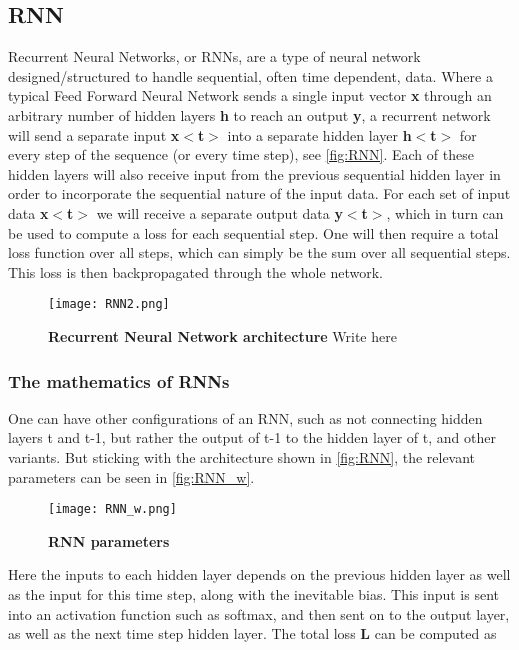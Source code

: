 \subsection{RNN}
Recurrent Neural Networks, or RNNs, are a type of neural network designed/structured to handle sequential, often time dependent, data. Where a typical Feed Forward Neural Network sends a single input vector \textbf{x} through an arbitrary number of hidden layers \textbf{h} to reach an output \textbf{y}, a recurrent network will send a separate input \textbf{x$<$t$>$} into a separate hidden layer \textbf{h$<$t$>$} for  every step of the sequence (or every time step), see \autoref{fig:RNN}. Each of these hidden layers will also receive input from the previous sequential hidden layer in order to incorporate the sequential nature of the input data. For each set of input data \textbf{x$<$t$>$} we will receive a separate output data \textbf{y$<$t$>$}, which in turn can be used to compute a loss for each sequential step. One will then require a total loss function over all steps, which can simply be the sum over all sequential steps. This loss is then backpropagated through the whole network. 

\begin{figure}[!htb]
 \centering
 \texttt{[image: RNN2.png]}
 \caption{\textbf{Recurrent Neural Network architecture} Write here}
 \label{fig:RNN}
\end{figure}

\subsubsection{The mathematics of RNNs}
One can have other configurations of an RNN, such as not connecting hidden layers t and t-1, but rather the output of t-1 to the hidden layer of t, and other variants. But sticking with the architecture shown in \autoref{fig:RNN}, the relevant parameters can be seen in \autoref{fig:RNN_w}.

\begin{figure}[!htb]
 \centering
 \texttt{[image: RNN\_w.png]}
 \caption{\textbf{RNN parameters}}
 \label{fig:RNN_w}
\end{figure}

Here the inputs to each hidden layer depends on the previous hidden layer as well as the input for this time step, along with the inevitable bias. This input is sent into an activation function such as softmax, and then sent on to the output layer, as well as the next time step hidden layer.
The total loss \textbf{L} can be computed as

